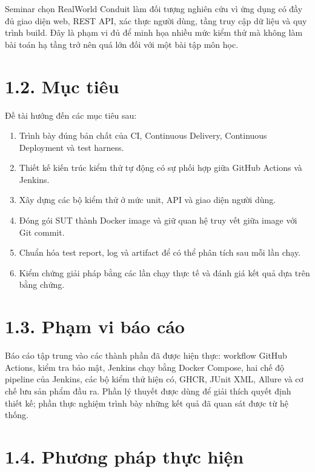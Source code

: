 \documentclass[
  vietnamese,
  12pt,
  a4paper,
  oneside]{report}
\providecommand{\tightlist}{%
  \setlength{\itemsep}{0pt}\setlength{\parskip}{0pt}}
\begin{document}
Seminar chọn RealWorld Conduit làm đối tượng nghiên cứu vì ứng dụng có
đầy đủ giao diện web, REST API, xác thực người dùng, tầng truy cập dữ
liệu và quy trình build. Đây là phạm vi đủ để minh họa nhiều mức kiểm
thử mà không làm bài toán hạ tầng trở nên quá lớn đối với một bài tập
môn học.

\section{1.2. Mục tiêu}\label{12-mux1ee5c-tiuxeau}

Đề tài hướng đến các mục tiêu sau:

\begin{enumerate}
\def\labelenumi{\arabic{enumi}.}
\tightlist
\item
  Trình bày đúng bản chất của CI, Continuous Delivery, Continuous
  Deployment và test harness.
\item
  Thiết kế kiến trúc kiểm thử tự động có sự phối hợp giữa GitHub Actions
  và Jenkins.
\item
  Xây dựng các bộ kiểm thử ở mức unit, API và giao diện người dùng.
\item
  Đóng gói SUT thành Docker image và giữ quan hệ truy vết giữa image với
  Git commit.
\item
  Chuẩn hóa test report, log và artifact để có thể phân tích sau mỗi lần
  chạy.
\item
  Kiểm chứng giải pháp bằng các lần chạy thực tế và đánh giá kết quả dựa
  trên bằng chứng.
\end{enumerate}

\section{1.3. Phạm vi báo cáo}\label{13-phux1ea1m-vi-buxe1o-cuxe1o}

Báo cáo tập trung vào các thành phần đã được hiện thực: workflow GitHub
Actions, kiểm tra bảo mật, Jenkins chạy bằng Docker Compose, hai chế độ
pipeline của Jenkins, các bộ kiểm thử hiện có, GHCR, JUnit XML, Allure
và cơ chế lưu sản phẩm đầu ra. Phần lý thuyết được dùng để giải thích
quyết định thiết kế; phần thực nghiệm trình bày những kết quả đã quan
sát được từ hệ thống.

\section{1.4. Phương pháp thực
hiện}\label{14-phux1b0ux1a1ng-phuxe1p-thux1ef1c-hiux1ec7n}
\end{document}
